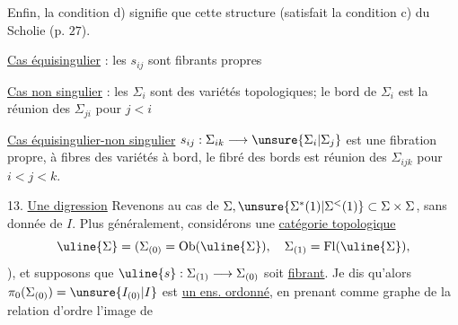 Enfin, la condition d) signifie que cette structure
(satisfait la condition c) du Scholie (p. $27$).

\uline{Cas équisingulier} : les $s_{ij}$ sont fibrants propres

\uline{Cas non singulier} : les $\Sigma_i$ sont des variétés
topologiques; le bord de $\Sigma_i$ est la réunion
des $\Sigma_{ji}$ pour $j<i$ 

\uline{Cas équisingulier-non singulier}
$s_{ij}:\Sigma_{ik}\longrightarrow\unsure{\Sigma_i|\Sigma_j}$ est
une fibration propre, à fibres des variétés
à bord, le fibré des bords est réunion
des $\Sigma_{ijk}$ pour $i<j<k$.

13. \uline{Une digression} Revenons au cas de
$\Sigma,\unsure{\Sigma^{*}(1)|\Sigma^{<}(1)}\subset\Sigma\times\Sigma$, sans donnée de $I$. Plus
généralement, considérons une \uline{catégorie topologique}
\[
\uline{\Sigma}=(\Sigma_{(0)}=\operatorname{Ob}(\uline{\Sigma}),\quad\Sigma_{(1)}=\operatorname{Fl}(\uline{\Sigma}),
\]
), et supposons
que $\uline{s}:\Sigma_{(1)}\longrightarrow\Sigma_{(0)}$ soit \uline{fibrant}. Je dis
qu'alors $\pi_0(\Sigma_{(0)})=\unsure{I_{(0)}|I}$ est \uline{un ens. ordonné},
en prenant comme graphe de la relation
d'ordre l'image de
